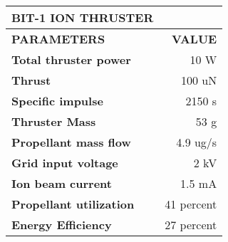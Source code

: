 \begin{longtable}{| l | r |}

\hline
\rowcolor[gray]{0.60}	\textbf{BIT-1 ION THRUSTER} \\
\hline

\hline
\rowcolor[gray]{0.75}	\textbf{PARAMETERS} &  \textbf{VALUE}   \\
\hline

\cellcolor[gray]{0.85} \textbf{Total thruster power} & 10 W  \\
\cellcolor[gray]{0.85} \textbf{Thrust} & 100 uN \\
\cellcolor[gray]{0.85} \textbf{Specific impulse} & 2150 s \\
\cellcolor[gray]{0.85} \textbf{Thruster Mass} & 53 g \\
\cellcolor[gray]{0.85} \textbf{Propellant mass flow} & 4.9 ug/s \\
\cellcolor[gray]{0.85} \textbf{Grid input voltage} & 2 kV \\
\cellcolor[gray]{0.85} \textbf{Ion beam current} & 1.5 mA \\
\cellcolor[gray]{0.85} \textbf{Propellant utilization} & 41 percent \\
\cellcolor[gray]{0.85} \textbf{Energy Efficiency} & 27 percent \\
\hline

\end{longtable}


